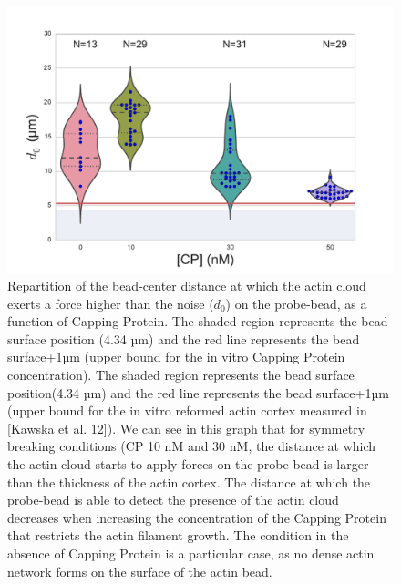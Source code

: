 \documentclass[A4paperpaper,11pt,english]{sphinxmanual}
\begin{document}
\begin{figure}[htbp]
\centering
\capstart

\includegraphics[width=0.650\linewidth]{d0_violin.pdf}
\caption{Repartition of the bead-center distance at which the actin cloud exerts a
force higher than the noise (\(d_0\)) on the probe-bead, as a function of
Capping Protein. The shaded region represents the bead surface position     (4.34 µm) and the red line represents the bead surface+1µm (upper bound for
the in vitro
Capping Protein concentration). The shaded region represents the bead surface position(4.34 µm) and the red line represents the bead surface+1µm
(upper bound for the in vitro
reformed actin cortex measured in {\hyperref[index-latex:kawska2012]{{[}Kawska et al. 12{]}}}). We can see in this graph that for symmetry breaking
conditions (CP 10 nM and 30 nM, the distance at which the actin cloud starts to apply
forces on the probe-bead is larger than the thickness of the actin
cortex. The distance at which the probe-bead is able to detect the presence
of the actin cloud decreases when increasing the concentration of the Capping
Protein that restricts  the actin filament growth. The condition in the absence
of Capping Protein is a particular case, as no dense actin network forms
on the surface of the actin bead.}\label{index-latex:d0-violin}\end{figure}
\end{document}
